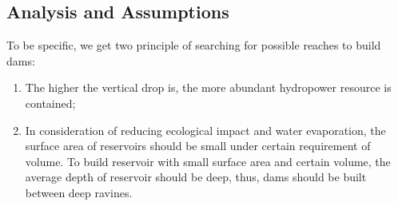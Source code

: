 \documentclass{mcmthesis}
\begin{document}
\subsection{Analysis and Assumptions}
\indent \indent To be specific, we get two principle of searching for possible reaches to build dams:
\begin{enumerate}
  \setlength{\itemsep}{0pt}
  \setlength{\parsep}{0pt}
  \setlength{\parskip}{0pt}
  \item The higher the vertical drop is, the more abundant hydropower resource is contained;
  \item In consideration of reducing ecological impact and water evaporation, the surface area of reservoirs should be small under certain requirement of volume. To build reservoir with small surface area and certain volume, the average depth of reservoir should be deep, thus, dams should be built between deep ravines.
\end{enumerate}
\end{document}
